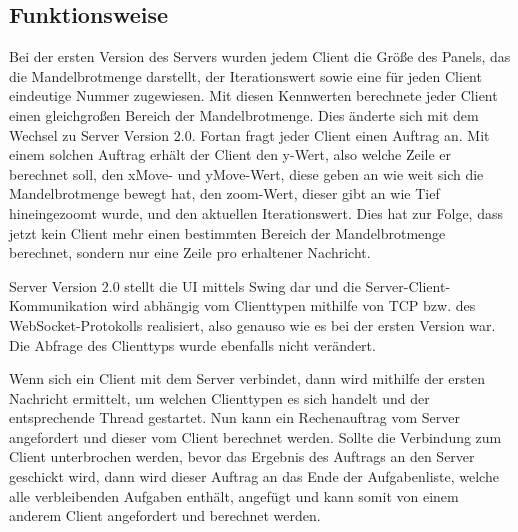 \documentclass[12pt, onecolumn, notitlepage]{scrartcl}
\begin{document}
\subsection{Funktionsweise}
Bei der ersten Version des Servers wurden jedem Client die Größe des Panels, das die Mandelbrotmenge darstellt, der Iterationswert sowie eine für jeden Client eindeutige Nummer zugewiesen. Mit diesen Kennwerten berechnete jeder Client einen gleichgroßen Bereich der Mandelbrotmenge. Dies änderte sich mit dem Wechsel zu Server Version 2.0. Fortan fragt jeder Client einen Auftrag an. Mit einem solchen Auftrag erhält der Client den y-Wert, also welche Zeile er berechnet soll, den xMove- und yMove-Wert, diese geben an wie weit sich die Mandelbrotmenge bewegt hat, den zoom-Wert, dieser gibt an wie Tief hineingezoomt wurde, und den aktuellen Iterationswert. Dies hat zur Folge, dass jetzt kein Client mehr einen bestimmten Bereich der Mandelbrotmenge berechnet, sondern nur eine Zeile pro erhaltener Nachricht. \par
Server Version 2.0 stellt die UI mittels Swing dar und die Server-Client-Kommunikation wird abhängig vom Clienttypen mithilfe von TCP bzw. des WebSocket-Protokolls realisiert, also genauso wie es bei der ersten Version war. Die Abfrage des Clienttyps wurde ebenfalls nicht verändert. \par
Wenn sich ein Client mit dem Server verbindet, dann wird mithilfe der ersten Nachricht ermittelt, um welchen Clienttypen es sich handelt und der entsprechende Thread gestartet. Nun kann ein Rechenauftrag vom Server angefordert und dieser vom Client berechnet werden. Sollte die Verbindung zum Client unterbrochen werden, bevor das Ergebnis des Auftrags an den Server geschickt wird, dann wird dieser Auftrag an das Ende der Aufgabenliste, welche alle verbleibenden Aufgaben enthält, angefügt und kann somit von einem anderem Client angefordert und berechnet werden.
\end{document}

